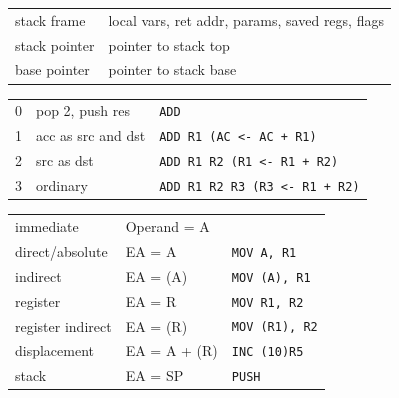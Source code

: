 \documentclass[10pt]{article}
\newcommand{\code}[1]{\texttt{#1}}
\begin{document}
\begin{multicols*}{2}
    \begin{tcolorbox}[title=Function Call and Operand Count]
        \begin{tabular}{ll}
            stack frame   & local vars, ret addr, params, saved regs, flags \\
            stack pointer & pointer to stack top                            \\
            base pointer  & pointer to stack base                           \\
            \hline
        \end{tabular}
        \begin{tabular}{lll}
            0 & pop 2, push res    & \code{ADD}                          \\
            1 & acc as src and dst & \code{ADD R1 (AC <- AC + R1)}       \\
            2 & src as dst         & \code{ADD R1 R2 (R1 <- R1 + R2)}    \\
            3 & ordinary           & \code{ADD R1 R2 R3 (R3 <- R1 + R2)} \\
        \end{tabular}
    \end{tcolorbox}

    \begin{tcolorbox}[title=Addressing Modes]
        \begin{tabular}{lll}
            immediate         & Operand = A  & \texttt{MOV #0x20,R1} \\
            direct/absolute   & EA = A       & \texttt{MOV A, R1}    \\
            indirect          & EA = (A)     & \texttt{MOV (A), R1}  \\
            register          & EA = R       & \texttt{MOV R1, R2}   \\
            register indirect & EA = (R)     & \texttt{MOV (R1), R2} \\
            displacement      & EA = A + (R) & \texttt{INC (10)R5}   \\
            stack             & EA = SP      & \texttt{PUSH}         \\
        \end{tabular}
    \end{tcolorbox}

    \pagebreak

\end{multicols*}
\end{document}
